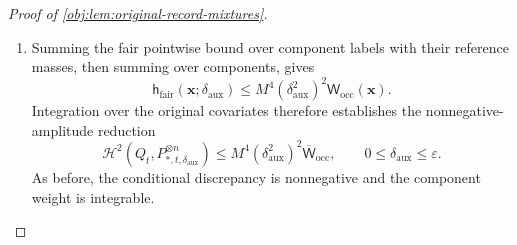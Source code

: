 \begin{proof}[Proof of \cref{obj:lem:original-record-mixtures}]
\begin{enumerate}
At zero amplitude the random and comparator tables coincide, so
\[
\mathsf D_{\mathcal V}^{\mathrm{fair}}(0)=0.
\]
The fair root is even in its amplitude by
\cref{obj:lem:exact-calibrations}; the comparator effect in
\cref{obj:def:calibration-maps} depends on the amplitude through its
square. Reversing the component signs consequently proves
\[
\mathsf D_{\mathcal V}^{\mathrm{fair}}(-\delta_0)
=\mathsf D_{\mathcal V}^{\mathrm{fair}}(\delta_0).
\]
Differentiating this equality at zero, using the supplied smoothness,
gives
\[
(\mathsf D_{\mathcal V}^{\mathrm{fair}})'(0)
=-(\mathsf D_{\mathcal V}^{\mathrm{fair}})'(0)=0.
\]
If \(\delta_{\mathrm{aux}}=0\), the difference is already zero. If
\(\delta_{\mathrm{aux}}>0\), Taylor's theorem with Lagrange remainder
provides \(\delta_{\mathrm{mid}}\in(0,\delta_{\mathrm{aux}})\) such that
\[
\mathsf D_{\mathcal V}^{\mathrm{fair}}(\delta_{\mathrm{aux}})
=
\frac{\delta_{\mathrm{aux}}^2}{2}
(\mathsf D_{\mathcal V}^{\mathrm{fair}})''(\delta_{\mathrm{mid}}).
\]
Thus in either case,
\[
|\mathsf D_{\mathcal V}^{\mathrm{fair}}(\delta_{\mathrm{aux}})|
\le
M^2m_{\mathcal V}^2 2^{m_{\mathcal V}}\delta_{\mathrm{aux}}^2
\le
2M^2m_{\mathcal V}^2 2^{m_{\mathcal V}}\delta_{\mathrm{aux}}^2.
\]
Using this last bound and the two positive floors,
\[
\begin{aligned}
\left(
\sqrt{\mathsf L_{t,\mathcal V}^{\mathrm{fair}}}
-\sqrt{\mathsf L_{*,\mathcal V}^{\mathrm{fair}}}
\right)^2
&=
\frac{(\mathsf D_{\mathcal V}^{\mathrm{fair}}
(\delta_{\mathrm{aux}}))^2}
{\left(
\sqrt{\mathsf L_{t,\mathcal V}^{\mathrm{fair}}}
+\sqrt{\mathsf L_{*,\mathcal V}^{\mathrm{fair}}}
\right)^2}\\
&\le
\frac{4M^4m_{\mathcal V}^4 4^{m_{\mathcal V}}
\delta_{\mathrm{aux}}^4}{4\,2^{-m_{\mathcal V}}}\\
&=M^4\delta_{\mathrm{aux}}^4\mathsf w_{\mathcal V}.
\end{aligned}
\]
Together with the small-component cases, this estimate holds for every
\(\mathcal V\in\mathscr B_{\mathbf x}\).

\item Summing the fair pointwise bound over component labels with their
reference masses, then summing over components, gives
\[
\mathsf h_{\mathrm{fair}}(\mathbf x;\delta_{\mathrm{aux}})
\le
M^4(\delta_{\mathrm{aux}}^2)^2
\mathsf W_{\mathrm{occ}}(\mathbf x).
\]
Integration over the original covariates therefore establishes the
nonnegative-amplitude reduction
\[
\mathcal H^2(Q_t,P_{*,t,\delta_{\mathrm{aux}}}^{\otimes n})
\le
M^4(\delta_{\mathrm{aux}}^2)^2
\overline{\mathsf W}_{\mathrm{occ}},
\qquad 0\le\delta_{\mathrm{aux}}\le\varepsilon.
\]
As before, the conditional discrepancy is nonnegative and the
component weight is integrable.


\end{enumerate}
\end{proof}
